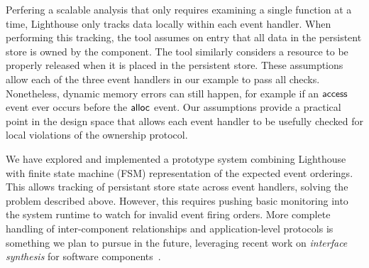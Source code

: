 Perfering a scalable analysis that only requires examining a single function
at a time, Lighthouse only tracks data locally within each event handler.  
%
When performing this tracking, the tool assumes on entry that all data in the
persistent store is owned by the component.
%
The tool similarly considers a resource to be properly released when it is
placed in the persistent store.  
%
These assumptions allow each of the three event handlers in our example to
pass all checks.  
%
Nonetheless, dynamic memory errors can still happen, for example if an
${\mathsf{access}}$ event ever occurs before the ${\mathsf{alloc}}$ event.  
%
Our assumptions provide a practical point in the design space that allows each
event handler to be usefully checked for local violations of the ownership
protocol.  



We have explored and implemented a prototype system combining Lighthouse with
finite state machine (FSM) representation of the expected event orderings.
%
This allows tracking of persistant store state across event handlers, solving
the problem described above.
%
However, this requires pushing basic monitoring into the system runtime to
watch for invalid event firing orders.
%
More complete handling of inter-component relationships and application-level
protocols is something we plan to pursue in the future, leveraging recent work
on {\em interface synthesis} for software components~\cite{AlurPOPL05,HJM05}.

